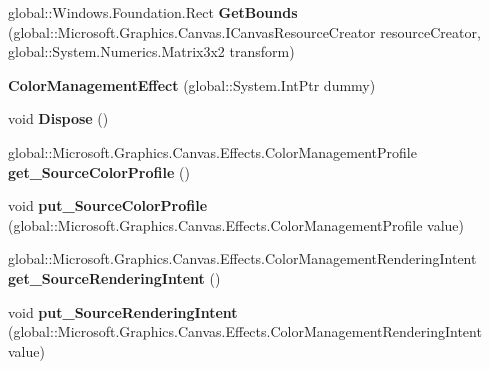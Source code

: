 \begin{DoxyCompactItemize}
global\+::\+Windows.\+Foundation.\+Rect {\bfseries Get\+Bounds} (global\+::\+Microsoft.\+Graphics.\+Canvas.\+I\+Canvas\+Resource\+Creator resource\+Creator, global\+::\+System.\+Numerics.\+Matrix3x2 transform)
\item 
\mbox{\label{class_microsoft_1_1_graphics_1_1_canvas_1_1_effects_1_1_color_management_effect_aa98fb6a9945a4d5480799dcff373d48b}} 
{\bfseries Color\+Management\+Effect} (global\+::\+System.\+Int\+Ptr dummy)
\item 
\mbox{\label{class_microsoft_1_1_graphics_1_1_canvas_1_1_effects_1_1_color_management_effect_a9fe37cfd32383d04402b1d66ee3eda0a}} 
void {\bfseries Dispose} ()
\item 
\mbox{\label{class_microsoft_1_1_graphics_1_1_canvas_1_1_effects_1_1_color_management_effect_a6b058fa689ed71507e964b28fe6170c5}} 
global\+::\+Microsoft.\+Graphics.\+Canvas.\+Effects.\+Color\+Management\+Profile {\bfseries get\+\_\+\+Source\+Color\+Profile} ()
\item 
\mbox{\label{class_microsoft_1_1_graphics_1_1_canvas_1_1_effects_1_1_color_management_effect_a5810de208f1afdb9ab4f2e1b99d5216f}} 
void {\bfseries put\+\_\+\+Source\+Color\+Profile} (global\+::\+Microsoft.\+Graphics.\+Canvas.\+Effects.\+Color\+Management\+Profile value)
\item 
\mbox{\label{class_microsoft_1_1_graphics_1_1_canvas_1_1_effects_1_1_color_management_effect_a3e5a8a23a3a6aa5fd2f094f13e898a44}} 
global\+::\+Microsoft.\+Graphics.\+Canvas.\+Effects.\+Color\+Management\+Rendering\+Intent {\bfseries get\+\_\+\+Source\+Rendering\+Intent} ()
\item 
\mbox{\label{class_microsoft_1_1_graphics_1_1_canvas_1_1_effects_1_1_color_management_effect_ae01d8260768b483504a24daed27da2b8}} 
void {\bfseries put\+\_\+\+Source\+Rendering\+Intent} (global\+::\+Microsoft.\+Graphics.\+Canvas.\+Effects.\+Color\+Management\+Rendering\+Intent value)

\end{DoxyCompactItemize}
